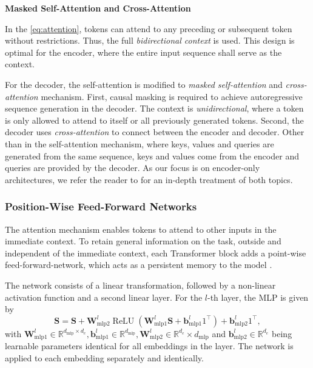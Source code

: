 \textbf{Masked Self-Attention and Cross-Attention}

In the \cref{eq:attention}, tokens can attend to any preceding or subsequent token without restrictions. Thus, the full \emph{bidirectional context} is used. This design is optimal for the encoder, where the entire input sequence shall serve as the context.

For the decoder, the self-attention is modified to \emph{masked self-attention} and \emph{cross-attention} mechanism. First, causal masking is required to achieve autoregressive sequence generation in the decoder. The context is \emph{unidirectional}, where a token is only allowed to attend to itself or all previously generated tokens. Second, the decoder uses \emph{cross-attention} to connect between the encoder and decoder. Other than in the self-attention mechanism, where keys, values and queries are generated from the same sequence, keys and values come from the encoder and queries are provided by the decoder. As our focus is on encoder-only architectures, we refer the reader to \textcite[][16--17]{raffelExploringLimitsTransfer2020} for an in-depth treatment of both topics.

\subsubsection{Position-Wise Feed-Forward Networks}\label{sec:position-wise-ffn}

The attention mechanism enables \glspl{token} to attend to other inputs in the immediate context. To retain general information on the task, outside and independent of the immediate context, each Transformer block adds a point-wise \gls{feed-forward-network}, which acts as a persistent memory to the model \autocite[][3]{sukhbaatarAugmentingSelfattentionPersistent2019}.

The network consists of a linear transformation, followed by a non-linear activation function and a second linear layer. For the $l$-th layer, the \gls{MLP} is given by
\begin{equation}
    \mathbf{S} = \mathbf{S}+\mathbf{W}_{\mathrm{mlp} 2}^l \operatorname{ReLU}\left(\mathbf{W}_{\mathrm{mlp} 1}^l \mathbf{S}+\mathbf{b}_{\mathrm{mlp} 1}^l 1^{\top}\right)+\mathbf{b}_{\mathrm{mlp} 2}^l 1^{\top},
\end{equation}
with $\mathbf{W}_{\mathrm{mlp} 1}^l \in \mathbb{R}^{d_{\mathrm{mlp}} \times d_{e}}, \mathbf{b}_{\mathrm{mlp} 1}^l \in \mathbb{R}^{d_{\mathrm{mlp}}}, \mathbf{W}_{\mathrm{mlp} 2}^l \in \mathbb{R}^{d_{e}} \times d_{\mathrm{mlp}}$ and $\mathbf{b}_{\mathrm{mlp} 2}^l \in \mathbb{R}^{d_{e}}$ being learnable parameters identical for all \glspl{embedding} in the layer. The network is applied to each embedding separately and identically.

